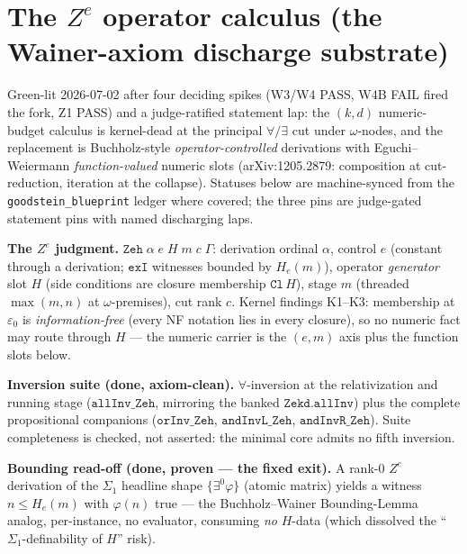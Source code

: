 \section{The \(Z^{e}\) operator calculus (the Wainer-axiom discharge substrate)}\label{sec:zeh}

Green-lit 2026-07-02 after four deciding spikes (W3/W4 PASS, W4B FAIL fired the fork, Z1 PASS) and
a judge-ratified statement lap: the \((k,d)\) numeric-budget calculus is kernel-dead at the
principal \(\forall/\exists\) cut under \(\omega\)-nodes, and the replacement is Buchholz-style
\emph{operator-controlled} derivations with Eguchi--Weiermann \emph{function-valued} numeric slots
(arXiv:1205.2879: composition at cut-reduction, iteration at the collapse).  Statuses below are
machine-synced from the \texttt{goodstein\_blueprint} ledger where covered; the three pins are
judge-gated statement pins with named discharging laps.

\begin{definition}\label{def:zeh_calculus}
  \leanok
\textbf{The \(Z^{e}\) judgment.}  \(\texttt{Zeh}\;\alpha\;e\;H\;m\;c\;\Gamma\): derivation ordinal
\(\alpha\), control \(e\) (constant through a derivation; \(\texttt{exI}\) witnesses bounded by
\(H_e(m)\)), operator \emph{generator} slot \(H\) (side conditions are closure membership
\(\texttt{Cl}\,H\)), stage \(m\) (threaded \(\max(m,n)\) at \(\omega\)-premises), cut rank \(c\).
Kernel findings K1--K3: membership at \(\varepsilon_0\) is \emph{information-free} (every NF
notation lies in every closure), so no numeric fact may route through \(H\) --- the numeric carrier
is the \((e,m)\) axis plus the function slots below.
\end{definition}

\begin{theorem}\label{thm:zeh_inversion}
  \leanok
\textbf{Inversion suite (done, axiom-clean).}  \(\forall\)-inversion at the relativization and
running stage (\(\texttt{allInv\_Zeh}\), mirroring the banked \(\texttt{Zekd.allInv}\)) plus the
complete propositional companions (\(\texttt{orInv\_Zeh}\), \(\texttt{andInvL\_Zeh}\),
\(\texttt{andInvR\_Zeh}\)).  Suite completeness is checked, not asserted: the minimal core admits
no fifth inversion.
\end{theorem}

\begin{theorem}\label{thm:zeh_readoff}
  \leanok
\textbf{Bounding read-off (done, proven --- the fixed exit).}  A rank-0 \(Z^{e}\) derivation of the
\(\Sigma_1\) headline shape \(\{\exists^0\varphi\}\) (atomic matrix) yields a witness
\(n \le H_e(m)\) with \(\varphi(n)\) true --- the Buchholz--Wainer Bounding-Lemma analog,
per-instance, no evaluator, consuming \emph{no} \(H\)-data (which dissolved the
``\(\Sigma_1\)-definability of \(H\)'' risk).
\end{theorem}

